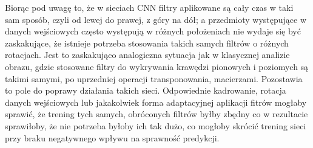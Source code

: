 Biorąc pod uwagę to, że w sieciach CNN filtry aplikowane są cały czas w taki sam sposób, czyli od lewej do prawej, z góry na dół; a przedmioty występujące w danych wejściowych często występują w różnych położeniach nie wydaje się być zaskakujące, że istnieje potrzeba stosowania takich samych filtrów o różnych rotacjach. 
Jest to zaskakująco analogiczna sytuacja jak w klasycznej analizie obrazu, gdzie stosowane filtry do wykrywania krawędzi pionowych i poziomych są takimi samymi, po uprzedniej operacji transponowania, macierzami.
Pozostawia to pole do poprawy działania takich sieci. Odpowiednie kadrowanie, rotacja danych wejściowych lub jakakolwiek forma adaptacyjnej aplikacji fitrów mogłaby sprawić, że trening tych samych, obróconych filtrów byłby zbędny co w rezultacie sprawiłoby, że nie potrzeba byłoby ich tak dużo, co mogłoby skrócić trening sieci przy braku negatywnego wpływu na sprawność predykcji.

